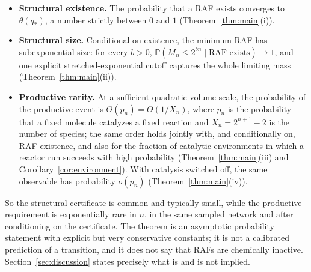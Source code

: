 \documentclass[11pt,letterpaper]{article}
\theoremstyle{plain}
\theoremstyle{definition}
\theoremstyle{remark}
\numberwithin{equation}{section}
\newcommand{\PP}{\mathbb P}
\newcommand{\thetaq}{\theta(q_*)}
\begin{document}
\begin{itemize}
\item \textbf{Structural existence.} The probability that a RAF exists converges to $\thetaq$, a number strictly between $0$ and $1$ (Theorem~\ref{thm:main}(i)).
\item \textbf{Structural size.} Conditional on existence, the minimum RAF has subexponential size: for every $b>0$, $\PP(M_n\le2^{bn}\mid\text{RAF exists})\to1$, and one explicit stretched-exponential cutoff captures the whole limiting mass (Theorem~\ref{thm:main}(ii)).
\item \textbf{Productive rarity.} At a sufficient quadratic volume scale, the probability of the productive event is $\Theta(p_n)=\Theta(1/X_n)$, where $p_n$ is the probability that a fixed molecule catalyzes a fixed reaction and $X_n=2^{n+1}-2$ is the number of species; the same order holds jointly with, and conditionally on, RAF existence, and also for the fraction of catalytic environments in which a reactor run succeeds with high probability (Theorem~\ref{thm:main}(iii) and Corollary~\ref{cor:environment}). With catalysis switched off, the same observable has probability $o(p_n)$ (Theorem~\ref{thm:main}(iv)).
\end{itemize}

So the structural certificate is common and typically small, while the productive requirement is exponentially rare in $n$, in the same sampled network and after conditioning on the certificate. The theorem is an asymptotic probability statement with explicit but very conservative constants; it is not a calibrated prediction of a transition, and it does not say that RAFs are chemically inactive. Section~\ref{sec:discussion} states precisely what is and is not implied.
\end{document}
